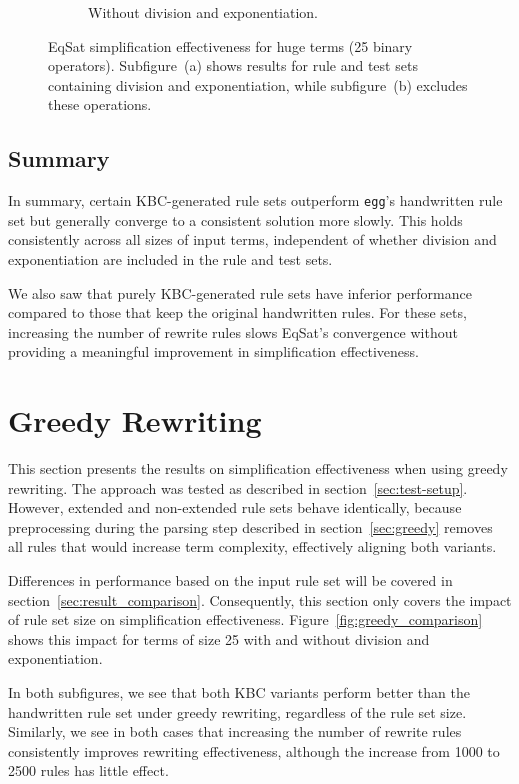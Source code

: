 \begin{figure}[h]
\begin{subfigure}[t]{0.48\textwidth}
		\caption{Without division and exponentiation.}
		\label{fig:eqsat_huge_no_div}
	\end{subfigure}
	\caption{
		EqSat simplification effectiveness for huge terms (25 binary operators).
		Subfigure~(a) shows results for rule and test sets containing division and exponentiation, 
		while subfigure~(b) excludes these operations.
	}
	\label{fig:eqsat_huge_comparison}
\end{figure}

\FloatBarrier
\subsection{Summary}
In summary, certain KBC-generated rule sets outperform \texttt{egg}'s handwritten rule set but generally converge to a consistent solution more slowly. This holds consistently across all sizes of input terms, independent of whether division and exponentiation are included in the rule and test sets. 

We also saw that purely KBC-generated rule sets have inferior performance compared to those that keep the original handwritten rules. For these sets, increasing the number of rewrite rules slows EqSat’s convergence without providing a meaningful improvement in simplification effectiveness.

\section{Greedy Rewriting}
\label{sec:greedy_results}

This section presents the results on simplification effectiveness when using greedy rewriting. The approach was tested as described in section~\ref{sec:test-setup}. However, extended and non-extended rule sets behave identically, because preprocessing during the parsing step described in section~\ref{sec:greedy} removes all rules that would increase term complexity, effectively aligning both variants.

Differences in performance based on the input rule set will be covered in section~\ref{sec:result_comparison}. Consequently, this section only covers the impact of rule set size on simplification effectiveness. Figure~\ref{fig:greedy_comparison} shows this impact for terms of size 25 with and without division and exponentiation.

In both subfigures, we see that both KBC variants perform better than the handwritten rule set under greedy rewriting, regardless of the rule set size. Similarly, we see in both cases that increasing the number of rewrite rules consistently improves rewriting effectiveness, although the increase from 1000 to 2500 rules has little effect.

